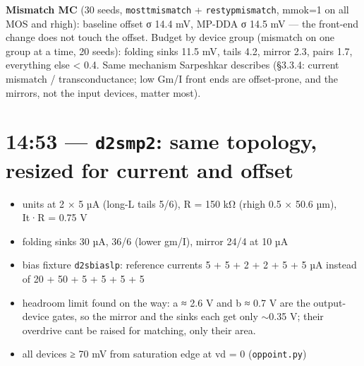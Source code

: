 \documentclass[11pt,a4paper]{article}
\providecommand{\tightlist}{\setlength{\itemsep}{0pt}\setlength{\parskip}{0pt}}
\renewcommand{\_}{\textunderscore\hspace{0pt}}
\begin{document}
\textbf{Mismatch MC} (30 seeds,
\texttt{mos\_tt\_mismatch} +
\texttt{res\_typ\_mismatch}, mm\_ok=1 on all MOS
and rhigh): baseline offset σ 14.4 mV, MP-DDA σ
14.5 mV --- the front-end change does not touch
the offset. Budget by device group (mismatch on
one group at a time, 20 seeds): folding sinks 11.5
mV, tails 4.2, mirror 2.3, pairs 1.7, everything
else \textless{} 0.4. Same mechanism Sarpeshkar
describes (§3.3.4: current mismatch /
transconductance; low Gm/I front ends are
offset-prone, and the mirrors, not the input
devices, matter most).

\hypertarget{1453--d2s_mp2-same-topology-resized-for-current-and-offset}{%
\section{\texorpdfstring{14:53 ---
\texttt{d2s\_mp2}: same topology, resized for
current and
offset}{14:53 --- d2s\_mp2: same topology, resized for current and offset}}\label{1453--d2s_mp2-same-topology-resized-for-current-and-offset}}

\begin{itemize}
\tightlist
\item
  units at 2 × 5 µA (long-L tails 5/6), R = 150 kΩ
  (rhigh 0.5 × 50.6 µm), I\_t·R = 0.75 V
\item
  folding sinks 30 µA, 36/6 (lower gm/I), mirror
  24/4 at 10 µA
\item
  bias fixture \texttt{d2s\_bias\_lp}: reference
  currents 5 + 5 + 2 + 2 + 5 + 5 µA instead of 20
  + 50 + 5 + 5 + 5 + 5
\item
  headroom limit found on the way: a ≈ 2.6 V and b
  ≈ 0.7 V are the output-device gates, so the
  mirror and the sinks each get only
  $\sim$0.35 V; their overdrive
  can\textquotesingle t be raised for matching,
  only their area.
\item
  all devices ≥ 70 mV from saturation edge at vd =
  0 (\texttt{oppoint.py})
\end{itemize}
\end{document}
